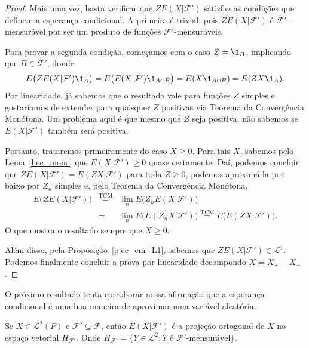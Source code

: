 \documentclass[../Notas_de_aula.tex]{subfiles}
\begin{document}
\begin{proof}
  Mais uma vez, basta verificar que $Z E(X|\mathcal{F}')$ satisfaz as condições que definem a esperança condicional.
  A primeira é trivial, pois $Z E(X|\mathcal{F}')$ é $\mathcal{F}'$-mensurável por ser um produto de funções $\mathcal{F}'$-mensuráveis.

  Para provar a segunda condição, começamos com o caso $Z = \1_B$, implicando que $B \in \mathcal{F}'$, donde
  \begin{equation*}
    E\big(ZE(X|\mathcal{F}') \1_A \big) = E\big( E(X|\mathcal{F}') \1_{A \cap B}\big) = E(X \1_{A \cap B}) = E(ZX \1_A).
  \end{equation*}
  Por linearidade, já sabemos que o resultado vale para funções $Z$ simples e gostaríamos de extender para quaisquer $Z$ positivas via Teorema da Convergência Monótona.
  Um problema aqui é que mesmo que $Z$ seja positiva, não sabemos se $E(X|\mathcal{F}')$ também será positiva.

  Portanto, trataremos primeiramente do caso $X \geq 0$.
  Para tais $X$, sabemos pelo Lema~\ref{l:ec_mono} que $E(X|\mathcal{F}') \geq 0$ quase certamente.
  Daí, podemos concluir que $Z E(X|\mathcal{F}') = E(ZX|\mathcal{F}')$ para toda $Z \geq 0$, podemos aproximá-la por baixo por $Z_n$ simples e, pelo Teorema da Convergência Monótona,
  \begin{equation}
    \begin{array}{e}
      E\big( Z E(X|\mathcal{F}') \big) & \overset{\text{TCM}}= & \lim_n E\big( Z_n E(X|\mathcal{F}') \big)\\
      & = & \lim_n E\big( E(Z_n X|\mathcal{F}') \big) \overset{\text{TCM}}= E\big( E(ZX|\mathcal{F}') \big).
    \end{array}
  \end{equation}
  O que mostra o resultado sempre que $X \geq 0$.

  Além disso, pela Proposição~\ref{p:ec_em_L1}, sabemos que $Z E(X|\mathcal{F}') \in \mathcal{L}^1$.
  Podemos finalmente concluir a prova por linearidade decompondo $X = X_+ - X_-$.
\end{proof}

O próximo resultado tenta corroborar nossa afirmação que a esperança condicional é uma boa maneira de aproximar uma variável aleatória.

\begin{lemma}
  Se $X \in \mathcal{L}^2(P)$ e $\mathcal{F}' \subseteq \mathcal{F}$, então $E(X|\mathcal{F}')$ é a projeção ortogonal de $X$ no espaço vetorial $H_{\mathcal{F}'}$.
  Onde $H_{\mathcal{F}'} = \{Y \in \mathcal{L}^2; Y \text{ é $\mathcal{F}'$-mensurável}\}$.
\end{lemma}
\end{document}
